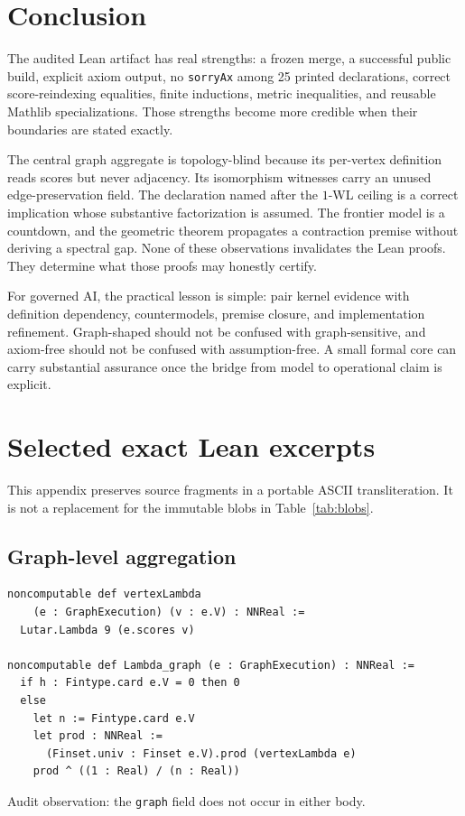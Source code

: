 \documentclass[10pt,letterpaper]{article}
\theoremstyle{definition}
\begin{document}
\section{Conclusion}\label{sec:conclusion}
The audited Lean artifact has real strengths: a frozen merge, a successful
public build, explicit axiom output, no \texttt{sorryAx} among 25 printed
declarations, correct score-reindexing equalities, finite inductions, metric
inequalities, and reusable Mathlib specializations. Those strengths become
more credible when their boundaries are stated exactly.

The central graph aggregate is topology-blind because its per-vertex definition
reads scores but never adjacency. Its isomorphism witnesses carry an unused
edge-preservation field. The declaration named after the \(1\)-WL ceiling is a
correct implication whose substantive factorization is assumed. The frontier
model is a countdown, and the geometric theorem propagates a contraction
premise without deriving a spectral gap. None of these observations invalidates
the Lean proofs. They determine what those proofs may honestly certify.

For governed AI, the practical lesson is simple: pair kernel evidence with
definition dependency, countermodels, premise closure, and implementation
refinement. Graph-shaped should not be confused with graph-sensitive, and
axiom-free should not be confused with assumption-free. A small formal core can
carry substantial assurance once the bridge from model to operational claim is
explicit.

\appendix
\section{Selected exact Lean excerpts}\label{app:lean}
This appendix preserves source fragments in a portable ASCII transliteration.
It is not a replacement for the immutable blobs in Table~\ref{tab:blobs}.

\subsection{Graph-level aggregation}
\begin{lstlisting}[language={}]
noncomputable def vertexLambda
    (e : GraphExecution) (v : e.V) : NNReal :=
  Lutar.Lambda 9 (e.scores v)

noncomputable def Lambda_graph (e : GraphExecution) : NNReal :=
  if h : Fintype.card e.V = 0 then 0
  else
    let n := Fintype.card e.V
    let prod : NNReal :=
      (Finset.univ : Finset e.V).prod (vertexLambda e)
    prod ^ ((1 : Real) / (n : Real))
\end{lstlisting}
Audit observation: the \texttt{graph} field does not occur in either body.
\end{document}
